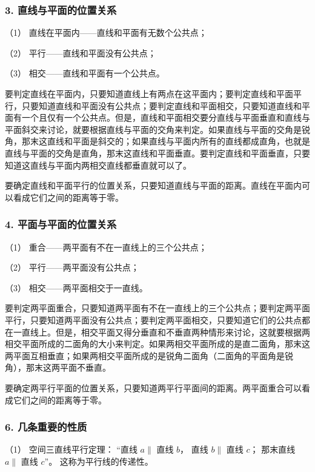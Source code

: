 \subsubsection{3.
直线与平面的位置关系}

（1） 直线在平面内------直线和平面有无数个公共点；

（2） 平行------直线和平面没有公共点；

（3） 相交------直线和平面有一个公共点。

要判定直线在平面内，只要知道直线上有两点在这平面内；要判定直线和平面平行，只要知道直线和平面没有公共点；要判定直线和平面相交，只要知道直线和平面有一个且仅有一个公共点。但是，直线和平面相交要分直线与平面垂直和直线与平面斜交来讨论，就要根据直线与平面的交角来判定。如果直线与平面的交角是锐角，那末这直线和平面是斜交的；如果直线与平面内所有的直线都成直角，也就是直线与平面的交角是直角，那末这直线和平面垂直。要判定直线和平面垂直，只要知道这直线与平面内两相交直线都垂直就可以了。

要确定直线和平面平行的位置关系，只要知道直线与平面的距离。直线在平面内可以看成它们之间的距离等于零。

\subsubsection{4.
平面与平面的位置关系}

（1） 重合------两平面有不在一直线上的三个公共点；

（2） 平行------两平面没有公共点；

（3） 相交------两平面相交于一直线。

要判定两平面重合，只要知道两平面有不在一直线上的三个公共点；要判定两平面平行，只要知道两平面没有公共点；要判定两平面相交，只要知道它们的公共点都在一直线上。但是，相交平面又得分垂直和不垂直两种情形来讨论，这就要根据两相交平面所成的二面角的大小来判定。如果两相交平面所成的是直二面角，那末这两平面互相垂直；如果两相交平面所成的是锐角二面角（二面角的平面角是锐角），那末这两平面不垂直。

要确定两平行平面的位置关系，只要知道两平行平面间的距离。两平面重合可以看成它们之间的距离等于零。

\subsubsection{6.
几条重要的性质}

（1） 空间三直线平行定理： ``直线 \(a \parallel\) 直线 \(b\)， 直线
\(b \parallel\) 直线 \(c\)； 那末直线 \(a \parallel\) 直线 \(c\)''。
这称为平行线的传递性。

